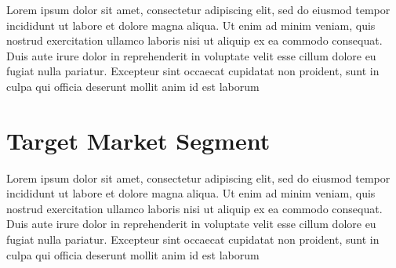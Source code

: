 Lorem ipsum dolor sit amet, consectetur adipiscing elit, sed do eiusmod tempor incididunt ut labore et dolore magna aliqua. Ut enim ad minim veniam, quis nostrud exercitation ullamco laboris nisi ut aliquip ex ea commodo consequat. Duis aute irure dolor in reprehenderit in voluptate velit esse cillum dolore eu fugiat nulla pariatur. Excepteur sint occaecat cupidatat non proident, sunt in culpa qui officia deserunt mollit anim id est laborum

\section{Target Market Segment}

Lorem ipsum dolor sit amet, consectetur adipiscing elit, sed do eiusmod tempor incididunt ut labore et dolore magna aliqua. Ut enim ad minim veniam, quis nostrud exercitation ullamco laboris nisi ut aliquip ex ea commodo consequat. Duis aute irure dolor in reprehenderit in voluptate velit esse cillum dolore eu fugiat nulla pariatur. Excepteur sint occaecat cupidatat non proident, sunt in culpa qui officia deserunt mollit anim id est laborum


